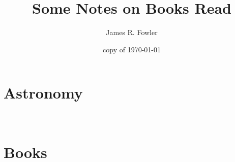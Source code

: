 \documentclass{article}
\begin{document}
\title{Some Notes on Books Read}
\author{James R. Fowler}
\date{copy of \today}
\maketitle


\section{Astronomy}\


\section{Books}\





\end{document}
